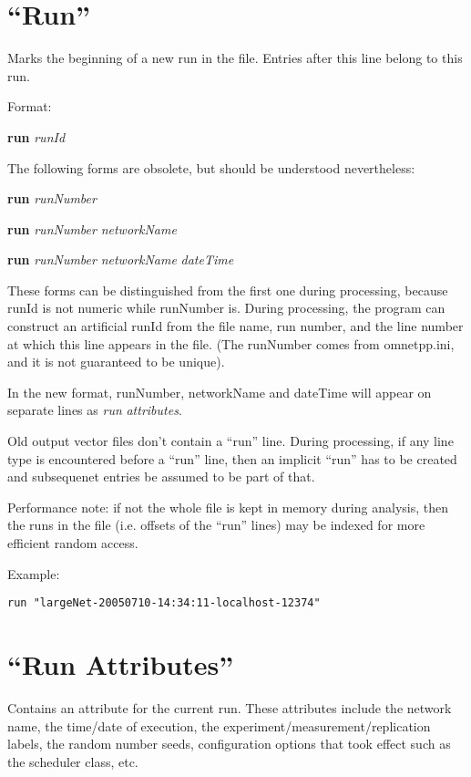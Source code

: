 \section{``Run''}

Marks the beginning of a new run in the file. Entries after this line
belong to this run.

Format:

\textbf{run} \textit{runId}

The following forms are obsolete, but should be understood nevertheless:

\textbf{run} \textit{runNumber}

\textbf{run} \textit{runNumber} \textit{networkName}

\textbf{run} \textit{runNumber} \textit{networkName} \textit{dateTime}

These forms can be distinguished from the first one during processing,
because runId is not numeric while runNumber is. During processing, the
program can construct an artificial runId from the file name, run
number, and the line number at which this line appears in the file.
(The runNumber comes from omnetpp.ini, and it is not guaranteed to be
unique).

In the new format, runNumber, networkName and dateTime will appear on
separate lines as \textit{run} \textit{attributes}.

Old output vector files don't contain a ``run'' line. During processing,
if any line type is encountered before a ``run'' line, then an implicit
``run'' has to be created and subsequenet entries be assumed to be
part of that.

Performance note: if not the whole file is kept in memory during
analysis, then the runs in the file (i.e. offsets of the ``run'' lines)
may be indexed for more efficient random access.

Example:

\begin{verbatim}
run "largeNet-20050710-14:34:11-localhost-12374"
\end{verbatim}

\section{``Run Attributes''}

Contains an attribute for the current run. These attributes include the
network name, the time/date of execution, the
experiment/measurement/replication labels, the random number seeds,
configuration options that took effect such as the scheduler class,
etc.

